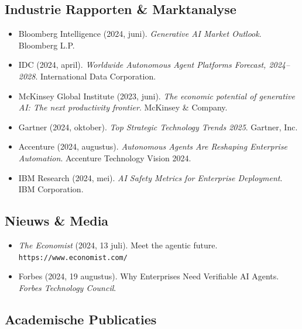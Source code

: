 \documentclass[11pt]{article}
\begin{document}
\subsection*{Industrie Rapporten \& Marktanalyse}

\begin{itemize}[leftmargin=*, label={}]
  \item Bloomberg Intelligence (2024, juni). \textit{Generative AI Market Outlook}. Bloomberg L.P.

  \item IDC (2024, april). \textit{Worldwide Autonomous Agent Platforms Forecast, 2024--2028}. International Data Corporation.

  \item McKinsey Global Institute (2023, juni). \textit{The economic potential of generative AI: The next productivity frontier}. McKinsey \& Company.

  \item Gartner (2024, oktober). \textit{Top Strategic Technology Trends 2025}. Gartner, Inc.

  \item Accenture (2024, augustus). \textit{Autonomous Agents Are Reshaping Enterprise Automation}. Accenture Technology Vision 2024.

  \item IBM Research (2024, mei). \textit{AI Safety Metrics for Enterprise Deployment}. IBM Corporation.
\end{itemize}

\subsection*{Nieuws \& Media}

\begin{itemize}[leftmargin=*, label={}]
  \item \textit{The Economist} (2024, 13 juli). Meet the agentic future. \texttt{https://www.economist.com/}

  \item Forbes (2024, 19 augustus). Why Enterprises Need Verifiable AI Agents. \textit{Forbes Technology Council}.
\end{itemize}

\subsection*{Academische Publicaties}
\end{document}
